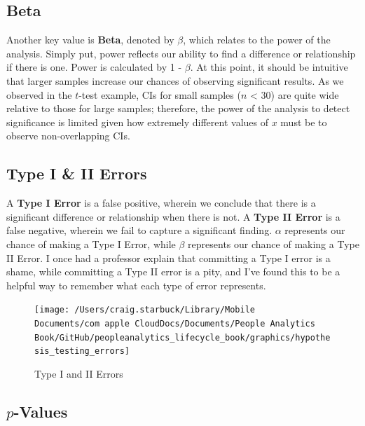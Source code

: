 \documentclass[]{book}
\begin{document}
\hypertarget{beta}{%
\subsection{Beta}\label{beta}}

Another key value is \textbf{Beta}, denoted by \(\beta\), which relates to the power of the analysis. Simply put, power reflects our ability to find a difference or relationship if there is one. Power is calculated by 1 - \(\beta\). At this point, it should be intuitive that larger samples increase our chances of observing significant results. As we observed in the \(t\)-test example, CIs for small samples (\(n\) \textless{} 30) are quite wide relative to those for large samples; therefore, the power of the analysis to detect significance is limited given how extremely different values of \(x\) must be to observe non-overlapping CIs.

\hypertarget{type-i-ii-errors}{%
\subsection{Type I \& II Errors}\label{type-i-ii-errors}}

A \textbf{Type I Error} is a false positive, wherein we conclude that there is a significant difference or relationship when there is not. A \textbf{Type II Error} is a false negative, wherein we fail to capture a significant finding. \(\alpha\) represents our chance of making a Type I Error, while \(\beta\) represents our chance of making a Type II Error. I once had a professor explain that committing a Type I error is a shame, while committing a Type II error is a pity, and I've found this to be a helpful way to remember what each type of error represents.

\begin{figure}

{\centering \texttt{[image: /Users/craig.starbuck/Library/Mobile Documents/com~apple~CloudDocs/Documents/People Analytics Book/GitHub/peopleanalytics\_lifecycle\_book/graphics/hypothesis\_testing\_errors]} 

}

\caption{Type I and II Errors}\label{fig:hyp-errs}
\end{figure}

\hypertarget{p-values}{%
\subsection{\texorpdfstring{\(p\)-Values}{p-Values}}\label{p-values}}
\end{document}
